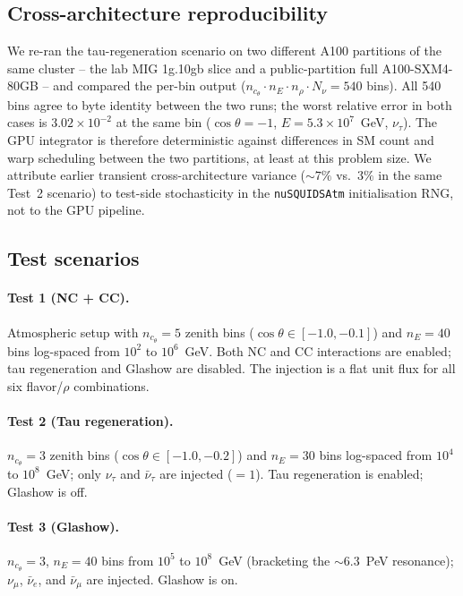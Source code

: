 \subsection{Cross-architecture reproducibility}

We re-ran the tau-regeneration scenario on two different A100
partitions of the same cluster -- the lab MIG 1g.10gb slice and a
public-partition full A100-SXM4-80GB -- and compared the per-bin
output ($n_{c_\theta} \cdot n_E \cdot n_\rho \cdot N_\nu = 540$
bins). All 540 bins agree to byte identity between the two runs;
the worst relative error in both cases is $3.02\!\times\!10^{-2}$
at the same bin
($\cos\theta = -1$, $E = 5.3\!\times\!10^7$~GeV, $\nu_\tau$). The GPU
integrator is therefore deterministic against differences in SM count
and warp scheduling between the two partitions, at least at this
problem size. We attribute earlier transient cross-architecture
variance ($\sim 7\%$ vs.\ $3\%$ in the same Test~2 scenario) to
test-side stochasticity in the \texttt{nuSQUIDSAtm} initialisation
RNG, not to the GPU pipeline.

\subsection*{Test scenarios}

\paragraph{Test 1 (NC + CC).} Atmospheric setup with $n_{c_\theta}\!=\!5$
zenith bins ($\cos\theta \in [-1.0, -0.1]$) and $n_E\!=\!40$ bins
log-spaced from $10^2$ to $10^6$~GeV. Both NC and CC interactions are
enabled; tau regeneration and Glashow are disabled. The injection is a
flat unit flux for all six flavor/$\rho$ combinations.

\paragraph{Test 2 (Tau regeneration).} $n_{c_\theta}\!=\!3$ zenith bins
($\cos\theta \in [-1.0, -0.2]$) and $n_E\!=\!30$ bins log-spaced from
$10^4$ to $10^8$~GeV; only $\nu_\tau$ and $\bar\nu_\tau$ are injected
($=\!1$). Tau regeneration is enabled; Glashow is off.

\paragraph{Test 3 (Glashow).} $n_{c_\theta}\!=\!3$, $n_E\!=\!40$ bins
from $10^5$ to $10^8$~GeV (bracketing the $\sim\!6.3$~PeV resonance);
$\nu_\mu$, $\bar\nu_e$, and $\bar\nu_\mu$ are injected. Glashow is on.

